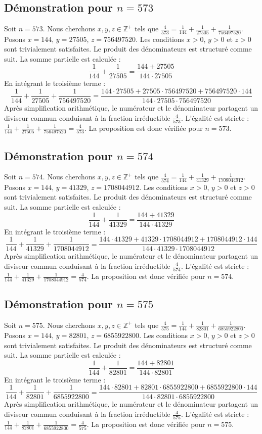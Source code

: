 \documentclass[11pt,a4paper]{article}
\begin{document}
\subsection{Démonstration pour $n = 573$}
Soit $n = 573$. Nous cherchons $x, y, z \in \mathbb{Z}^{+}$ tels que $\frac{4}{573} = \frac{1}{144} + \frac{1}{27505} + \frac{1}{756497520}$.
Posons $x = 144$, $y = 27505$, $z = 756497520$.
Les conditions $x > 0$, $y > 0$ et $z > 0$ sont trivialement satisfaites.
Le produit des dénominateurs est structuré comme suit. La somme partielle est calculée :
$$ \frac{1}{144} + \frac{1}{27505} = \frac{144+27505}{144 \cdot 27505} $$
En intégrant le troisième terme :
$$ \frac{1}{144} + \frac{1}{27505} + \frac{1}{756497520} = \frac{144 \cdot 27505 + 27505 \cdot 756497520 + 756497520 \cdot 144}{144 \cdot 27505 \cdot 756497520} $$
Après simplification arithmétique, le numérateur et le dénominateur partagent un diviseur commun conduisant à la fraction irréductible $\frac{4}{573}$.
L'égalité est stricte : $\frac{1}{144} + \frac{1}{27505} + \frac{1}{756497520} = \frac{4}{573}$.
La proposition est donc vérifiée pour $n = 573$.
\subsection{Démonstration pour $n = 574$}
Soit $n = 574$. Nous cherchons $x, y, z \in \mathbb{Z}^{+}$ tels que $\frac{4}{574} = \frac{1}{144} + \frac{1}{41329} + \frac{1}{1708044912}$.
Posons $x = 144$, $y = 41329$, $z = 1708044912$.
Les conditions $x > 0$, $y > 0$ et $z > 0$ sont trivialement satisfaites.
Le produit des dénominateurs est structuré comme suit. La somme partielle est calculée :
$$ \frac{1}{144} + \frac{1}{41329} = \frac{144+41329}{144 \cdot 41329} $$
En intégrant le troisième terme :
$$ \frac{1}{144} + \frac{1}{41329} + \frac{1}{1708044912} = \frac{144 \cdot 41329 + 41329 \cdot 1708044912 + 1708044912 \cdot 144}{144 \cdot 41329 \cdot 1708044912} $$
Après simplification arithmétique, le numérateur et le dénominateur partagent un diviseur commun conduisant à la fraction irréductible $\frac{4}{574}$.
L'égalité est stricte : $\frac{1}{144} + \frac{1}{41329} + \frac{1}{1708044912} = \frac{4}{574}$.
La proposition est donc vérifiée pour $n = 574$.
\subsection{Démonstration pour $n = 575$}
Soit $n = 575$. Nous cherchons $x, y, z \in \mathbb{Z}^{+}$ tels que $\frac{4}{575} = \frac{1}{144} + \frac{1}{82801} + \frac{1}{6855922800}$.
Posons $x = 144$, $y = 82801$, $z = 6855922800$.
Les conditions $x > 0$, $y > 0$ et $z > 0$ sont trivialement satisfaites.
Le produit des dénominateurs est structuré comme suit. La somme partielle est calculée :
$$ \frac{1}{144} + \frac{1}{82801} = \frac{144+82801}{144 \cdot 82801} $$
En intégrant le troisième terme :
$$ \frac{1}{144} + \frac{1}{82801} + \frac{1}{6855922800} = \frac{144 \cdot 82801 + 82801 \cdot 6855922800 + 6855922800 \cdot 144}{144 \cdot 82801 \cdot 6855922800} $$
Après simplification arithmétique, le numérateur et le dénominateur partagent un diviseur commun conduisant à la fraction irréductible $\frac{4}{575}$.
L'égalité est stricte : $\frac{1}{144} + \frac{1}{82801} + \frac{1}{6855922800} = \frac{4}{575}$.
La proposition est donc vérifiée pour $n = 575$.
\end{document}
